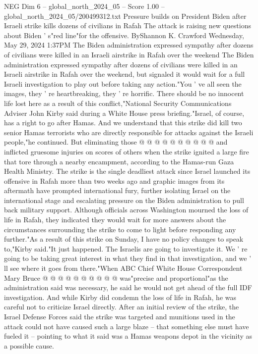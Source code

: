 \begin{textsample}{NEG Dim 6 – global\_north\_2024\_05 – Score 1.00 – global\_north\_2024\_05/200499312.txt}  \label{ex:f6_neg_296}
Pressure builds on President Biden after Israeli strike kills dozens of civilians in Rafah The attack is raising new questions about Biden ' s"red line"for the offensive.
ByShannon K.
Crawford Wednesday, May 29, 2024 1:37PM The Biden administration expressed sympathy after dozens of civilians were killed in an Israeli airstrike in Rafah over the weekend The Biden administration expressed sympathy after dozens of civilians were killed in an Israeli airstrike in Rafah over the weekend, but signaled it would wait for a full Israeli investigation to play out before taking any action."You ' ve all seen the images, they ' re heartbreaking, they ' re horrific.
There should be no innocent life lost here as a result of this conflict,"National Security Communications Adviser John Kirby said during a White House press briefing."Israel, of course, has a right to go after Hamas.
And we understand that this strike did kill two senior Hamas terrorists who are directly responsible for attacks against the Israeli people,"he continued.
But eliminating those @ @ @ @ @ @ @ @ @ @ and inflicted gruesome injuries on scores of others when the strike ignited a large fire that tore through a nearby encampment, according to the Hamas-run Gaza Health Ministry.
The strike is the single deadliest attack since Israel launched its offensive in Rafah more than two weeks ago and graphic images from its aftermath have prompted international fury, further isolating Israel on the international stage and escalating pressure on the Biden administration to pull back military support.
Although officials across Washington mourned the loss of life in Rafah, they indicated they would wait for more answers about the circumstances surrounding the strike to come to light before responding any further."As a result of this strike on Sunday, I have no policy changes to speak to,"Kirby said."It just happened.
The Israelis are going to investigate it.
We ' re going to be taking great interest in what they find in that investigation, and we ' ll see where it goes from there."When ABC Chief White House Correspondent Mary Bruce @ @ @ @ @ @ @ @ @ @ was"precise and proportional"as the administration said was necessary, he said he would not get ahead of the full IDF investigation.
And while Kirby did condemn the loss of life in Rafah, he was careful not to criticize Israel directly.
After an initial review of the strike, the Israel Defense Forces said the strike was targeted and munitions used in the attack could not have caused such a large blaze -- that something else must have fueled it -- pointing to what it said was a Hamas weapons depot in the vicinity as a possible cause.

\end{textsample}
